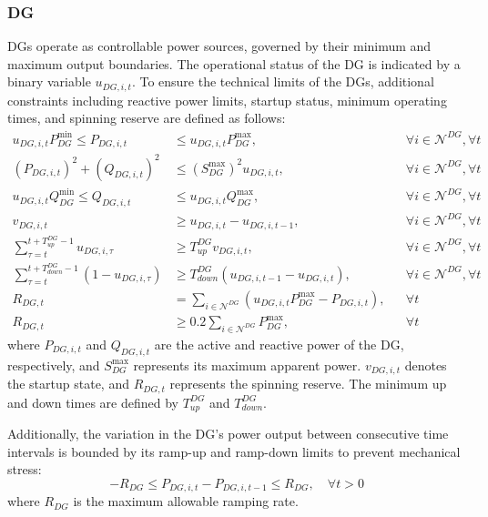 \subsubsection{DG}
DGs operate as controllable power sources, governed by their minimum and maximum output boundaries. The operational status of the DG is indicated by a binary variable $u_{DG,i,t}$. To ensure the technical limits of the DGs, additional constraints including reactive power limits, startup status, minimum operating times, and spinning reserve are defined as follows:
\begin{subequations}
\begin{align}
    u_{DG,i,t} P_{DG}^{\min} \le P_{DG,i,t} &\le u_{DG,i,t} P_{DG}^{\max}, && \forall i \in \mathcal{N}^{DG}, \forall t \label{eq:dg_active_limit} \\
    (P_{DG,i,t})^2 + (Q_{DG,i,t})^2 &\le (S_{DG}^{\max})^2 u_{DG,i,t}, && \forall i \in \mathcal{N}^{DG}, \forall t \label{eq:dg_apparent_limit} \\
    u_{DG,i,t} Q_{DG}^{\min} \le Q_{DG,i,t} &\le u_{DG,i,t} Q_{DG}^{\max}, && \forall i \in \mathcal{N}^{DG}, \forall t \label{eq:dg_q_limit} \\
    v_{DG,i,t} &\ge u_{DG,i,t} - u_{DG,i,t-1}, && \forall i \in \mathcal{N}^{DG}, \forall t \label{eq:dg_startup} \\
    \sum_{\tau=t}^{t+T_{up}^{DG}-1} u_{DG,i,\tau} &\ge T_{up}^{DG} v_{DG,i,t}, && \forall i \in \mathcal{N}^{DG}, \forall t \label{eq:dg_uptime} \\
    \sum_{\tau=t}^{t+T_{down}^{DG}-1} (1 - u_{DG,i,\tau}) &\ge T_{down}^{DG} (u_{DG,i,t-1} - u_{DG,i,t}), && \forall i \in \mathcal{N}^{DG}, \forall t \label{eq:dg_downtime} \\
    R_{DG,t} &= \sum_{i \in \mathcal{N}^{DG}} \left( u_{DG,i,t} P_{DG}^{\max} - P_{DG,i,t} \right), && \forall t \label{eq:dg_reserve_def} \\
    R_{DG,t} &\ge 0.2 \sum_{i \in \mathcal{N}^{DG}} P_{DG}^{\max}, && \forall t \label{eq:dg_reserve_req}
\end{align}
\end{subequations}
where $P_{DG,i,t}$ and $Q_{DG,i,t}$ are the active and reactive power of the DG, respectively, and $S_{DG}^{\max}$ represents its maximum apparent power. $v_{DG,i,t}$ denotes the startup state, and $R_{DG,t}$ represents the spinning reserve. The minimum up and down times are defined by $T_{up}^{DG}$ and $T_{down}^{DG}$.

Additionally, the variation in the DG's power output between consecutive time intervals is bounded by its ramp-up and ramp-down limits to prevent mechanical stress:
\begin{equation}
    -R_{DG} \le P_{DG,i,t} - P_{DG,i,t-1} \le R_{DG}, \quad \forall t > 0 \label{eq:dg_ramp_limit}
\end{equation}
where $R_{DG}$ is the maximum allowable ramping rate.

